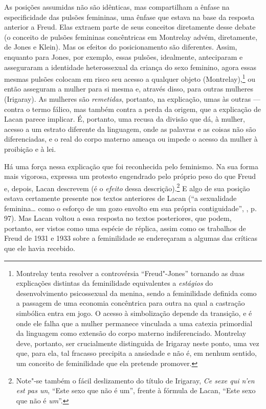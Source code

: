 As posições assumidas não são idênticas, mas compartilham a ênfase na
especificidade das pulsões femininas, uma ênfase que estava na base da
resposta anterior a Freud. Elas extraem parte de seus conceitos
diretamente desse debate (o conceito de pulsões femininas concêntricas
em Montrelay advém, diretamente, de Jones e Klein). Mas os efeitos do
posicionamento são diferentes. Assim, enquanto para Jones, por exemplo,
essas pulsões, idealmente, anteciparam e asseguraram a identidade
heterossexual da criança do sexo feminino, agora essas mesmas pulsões
colocam em risco seu acesso a qualquer objeto (Montrelay),\footnote{Montrelay %
  tenta resolver a controvérsia ``Freud"-Jones'' tornando as duas
  explicações distintas da feminilidade equivalentes a \emph{estágios}
  do desenvolvimento psicossexual da menina, sendo a feminilidade
  definida como a passagem de uma economia concêntrica para outra na
  qual a castração simbólica entra em jogo. O acesso à simbolização
  depende da transição, e é onde ele falha que a mulher permanece
  vinculada a uma catexia primordial da linguagem como extensão do corpo
  materno indiferenciado. Montrelay deve, portanto, ser crucialmente
  distinguida de Irigaray neste ponto, uma vez que, para ela, tal
  fracasso precipita a ansiedade e não é, em nenhum sentido, um conceito
  de feminilidade que ela pretende promover.} ou então asseguram a
mulher para si mesma e, através disso, para outras mulheres (Irigaray). %
As mulheres são \emph{remetidas}, portanto, na explicação, umas às
outras --- contra o termo fálico, mas também contra a perda da origem,
que a explicação de Lacan parece implicar. É, portanto, uma recusa da
divisão que dá, à mulher, acesso a um estrato diferente da linguagem,
onde as palavras e as coisas não são diferenciadas, e o real do corpo
materno ameaça ou impede o acesso da mulher à proibição e à lei.

Há uma força nessa explicação que foi reconhecida pelo feminismo. Na sua
forma mais vigorosa, expressa um protesto engendrado pelo próprio peso
do que Freud e, depois, Lacan descrevem (é o \emph{efeito} dessa
descrição).\footnote{Note"-se também o fácil deslizamento do título de
  Irigaray, \emph{Ce sexe qui n'en est pas un}, ``Este sexo que não é
  um'', frente à fórmula de Lacan, ``Este sexo que não é \emph{um}''.}
E algo de sua posição estava certamente presente nos textos anteriores
de Lacan (``a sexualidade feminina\ldots{} como o esforço de um gozo envolto
em sua própria contiguidade'', , p. 97). Mas Lacan voltou a essa
resposta no textos posteriores, que podem, portanto, ser vistos como uma
espécie de réplica, assim como os trabalhos de Freud de 1931 e 1933
sobre a feminilidade se endereçaram a algumas das críticas que ele havia
recebido.

